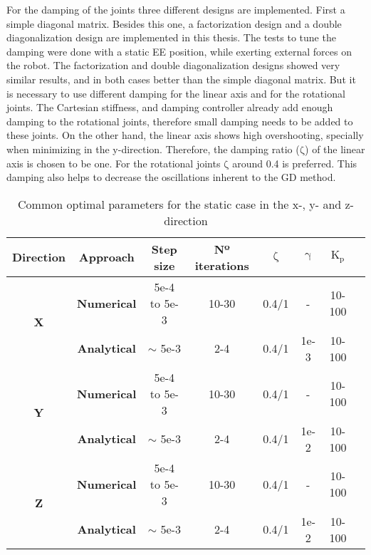 For the damping of the joints three different designs are implemented. First a simple diagonal matrix. Besides this one, a factorization design and a double diagonalization design \cite{alin_damping} are  implemented in this thesis. The tests to tune the damping were  done with a static EE position, while exerting external forces on the robot. The factorization and double diagonalization designs showed very similar results, and in both cases better than the simple diagonal matrix. But it is necessary to use different damping for the linear axis and for the rotational joints. The Cartesian stiffness, and damping controller  already add enough damping to the rotational joints, therefore small damping needs to be added to these joints. On the other hand, the linear axis shows high overshooting, specially when minimizing in the y-direction. Therefore, the  damping ratio ($\mathrm{\zeta}$) of the linear axis is chosen to be one. For the rotational joints $\mathrm{\zeta}$ around 0.4 is preferred.
This damping also helps to decrease the oscillations inherent to the GD method.







\begin{table}[]
	\centering
	\caption{Common optimal parameters for the static case in the x-, y- and z-direction}
	\label{table:table_SC}
	\begin{tabular}{|c|c|c|c|c|c|c|c|}
		\hline
		\textbf{Direction}          & \textbf{Approach}   & \textbf{Step size} & \textbf{Nº iterations} & \textbf{$\mathrm{\zeta}$} & \textbf{$\mathrm{\gamma}$} & \textbf{$\mathrm{K_p}$}  \\ \hline
		\multirow{2}{*}{\textbf{X}} & \textbf{Numerical}  & 5e-4 to 5e-3       & 10-30                          & 0.4/1                   & -             & 10-100                    \\ 
		& \textbf{Analytical} & $\sim$ 5e-3       & 2-4                        & 0.4/1                   & 1e-3       & 10-100                          \\ \hline
		\multirow{2}{*}{\textbf{Y}} & \textbf{Numerical}  & 5e-4 to 5e-3       & 10-30                          & 0.4/1                  & -                    & 10-100               \\ 
		& \textbf{Analytical} & $\sim$ 5e-3       & 2-4                             & 0.4/1                  & 1e-2        & 10-100                        \\ \hline
		\multirow{2}{*}{\textbf{Z}} & \textbf{Numerical}  & 5e-4 to 5e-3       & 10-30                          & 0.4/1                   & -                         & 10-100           \\ 
		& \textbf{Analytical} & $\sim$ 5e-3       & 2-4                             & 0.4/1                  & 1e-2      & 10-100         \\ \hline                 
	\end{tabular}
\end{table}












